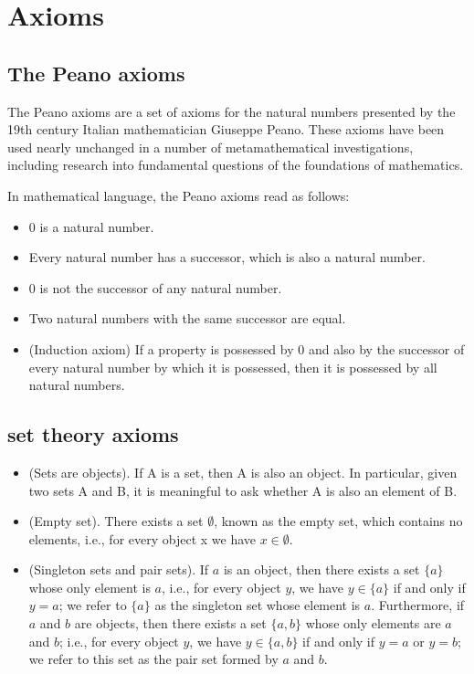 \documentclass{article}
\begin{document}
\section*{Axioms}

\subsection{The Peano axioms}
The Peano axioms are a set of axioms for the natural numbers presented by the 19th century Italian mathematician Giuseppe Peano.
These axioms have been used nearly unchanged in a number of metamathematical investigations, including research into fundamental questions of the foundations of mathematics.

In mathematical language, the Peano axioms read as follows:
\begin{itemize}
  \item 0 is a natural number.
  \item Every natural number has a successor, which is also a natural number.
  \item 0 is not the successor of any natural number.
  \item Two natural numbers with the same successor are equal.
  \item (Induction axiom) If a property is possessed by 0 and also by the successor of every natural number by which it is possessed, then it is possessed by all natural numbers.
\end{itemize}




\subsection{set theory axioms}
\begin{itemize}
	\item (Sets are objects). If A is a set, then A is also an object. In particular, given two sets A and B, it is meaningful to ask whether A is also an element of B.
	\item (Empty set). There exists a set $\emptyset$, known as the empty set, which contains no elements, i.e., for every object x we have $x\in \emptyset$.
	\item (Singleton sets and pair sets). If \( a \) is an object, then there exists a set \( \{a\} \) whose only element is \( a \), i.e., for every object \( y \), we have \( y \in \{a\} \) if and only if \( y = a \); we refer to \( \{a\} \) as the singleton set whose element is \( a \). Furthermore, if \( a \) and \( b \) are objects, then there exists a set \( \{a, b\} \) whose only elements are \( a \) and \( b \); i.e., for every object \( y \), we have \( y \in \{a, b\} \) if and only if \( y = a \) or \( y = b \); we refer to this set as the pair set formed by \( a \) and \( b \).
\end{itemize}
\end{document}
